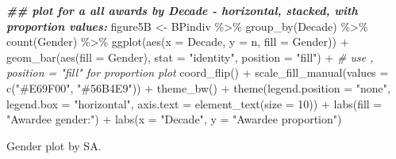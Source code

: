 \documentclass[
]{article}
\newenvironment{Shaded}{\begin{snugshade}}{\end{snugshade}}
\newcommand{\AttributeTok}[1]{\textcolor[rgb]{0.77,0.63,0.00}{#1}}
\newcommand{\CommentTok}[1]{\textcolor[rgb]{0.56,0.35,0.01}{\textit{#1}}}
\newcommand{\DecValTok}[1]{\textcolor[rgb]{0.00,0.00,0.81}{#1}}
\newcommand{\DocumentationTok}[1]{\textcolor[rgb]{0.56,0.35,0.01}{\textbf{\textit{#1}}}}
\newcommand{\FunctionTok}[1]{\textcolor[rgb]{0.00,0.00,0.00}{#1}}
\newcommand{\NormalTok}[1]{#1}
\newcommand{\OtherTok}[1]{\textcolor[rgb]{0.56,0.35,0.01}{#1}}
\newcommand{\SpecialCharTok}[1]{\textcolor[rgb]{0.00,0.00,0.00}{#1}}
\newcommand{\StringTok}[1]{\textcolor[rgb]{0.31,0.60,0.02}{#1}}
\begin{document}
\begin{Shaded}
\begin{Highlighting}[]
\DocumentationTok{\#\# plot for a all awards by Decade {-} horizontal, stacked, with proportion values:}
\NormalTok{figure5B }\OtherTok{\textless{}{-}}\NormalTok{ BPindiv }\SpecialCharTok{\%\textgreater{}\%} 
  \FunctionTok{group\_by}\NormalTok{(Decade) }\SpecialCharTok{\%\textgreater{}\%}
  \FunctionTok{count}\NormalTok{(Gender) }\SpecialCharTok{\%\textgreater{}\%}
  \FunctionTok{ggplot}\NormalTok{(}\FunctionTok{aes}\NormalTok{(}\AttributeTok{x =}\NormalTok{ Decade, }\AttributeTok{y =}\NormalTok{ n, }\AttributeTok{fill =}\NormalTok{ Gender)) }\SpecialCharTok{+}
  \FunctionTok{geom\_bar}\NormalTok{(}\FunctionTok{aes}\NormalTok{(}\AttributeTok{fill =}\NormalTok{ Gender), }\AttributeTok{stat =} \StringTok{"identity"}\NormalTok{, }\AttributeTok{position =} \StringTok{"fill"}\NormalTok{) }\SpecialCharTok{+} \CommentTok{\# use , position = "fill" for proportion plot}
  \FunctionTok{coord\_flip}\NormalTok{() }\SpecialCharTok{+} 
  \FunctionTok{scale\_fill\_manual}\NormalTok{(}\AttributeTok{values =} \FunctionTok{c}\NormalTok{(}\StringTok{"\#E69F00"}\NormalTok{, }\StringTok{"\#56B4E9"}\NormalTok{)) }\SpecialCharTok{+}
  \FunctionTok{theme\_bw}\NormalTok{() }\SpecialCharTok{+}
  \FunctionTok{theme}\NormalTok{(}\AttributeTok{legend.position =} \StringTok{"none"}\NormalTok{, }\AttributeTok{legend.box =} \StringTok{"horizontal"}\NormalTok{, }\AttributeTok{axis.text =} \FunctionTok{element\_text}\NormalTok{(}\AttributeTok{size =} \DecValTok{10}\NormalTok{)) }\SpecialCharTok{+}
  \FunctionTok{labs}\NormalTok{(}\AttributeTok{fill =} \StringTok{"Awardee gender:"}\NormalTok{) }\SpecialCharTok{+}
  \FunctionTok{labs}\NormalTok{(}\AttributeTok{x =} \StringTok{"Decade"}\NormalTok{, }\AttributeTok{y =} \StringTok{"Awardee proportion"}\NormalTok{)  }
\end{Highlighting}
\end{Shaded}

Gender plot by SA.
\end{document}
